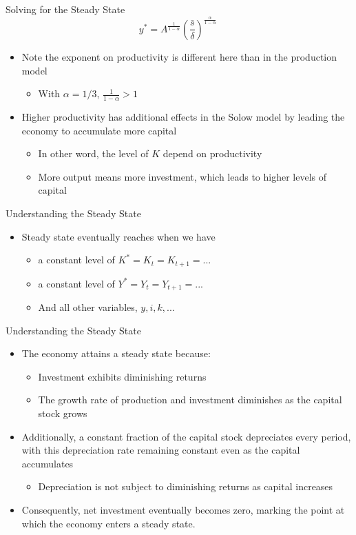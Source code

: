 \documentclass[aspectratio=1610]{beamer}
\begin{document}
\begin{frame}[wide]{Solving for the Steady State}
	\[y^* = A^{\frac{1}{1-\alpha}}\left(\frac{\bar{s} }{\delta}\right)^{\frac{\alpha}{1 - \alpha}}  \ \]
	\begin{itemize}
		\item Note the exponent on productivity is different here than in the production model
		\begin{itemize}
			\item With $\alpha = 1/3$, $\frac{1}{1-\alpha} > 1$
		\end{itemize}
	\vspace{3mm}
		\item Higher productivity has additional effects in the Solow model by leading the economy to accumulate more capital
		\begin{itemize}
			\item In other word, the level of $K$ depend on productivity
			\item More output means more investment, which leads to higher levels of capital
		\end{itemize}
	\end{itemize}
\end{frame}

\begin{frame}[wide]{Understanding the Steady State}
	\begin{itemize}
		\item Steady state eventually reaches when we have 
		\begin{itemize}
			\item a constant level of $K^*=K_t=K_{t+1} =...$
			\item a constant level of $Y^*=Y_t=Y_{t+1} =...$
			\item And all other variables, $y, i, k, ...$
		\end{itemize}
	\end{itemize}
\end{frame}

\begin{frame}[wide]{Understanding the Steady State}
	\begin{itemize}
		\item The economy attains a steady state because:
		\begin{itemize}
			\item Investment exhibits diminishing returns
			\item The growth rate of production and investment diminishes as the capital stock grows
		\end{itemize}
		\item Additionally, a constant fraction of the capital stock depreciates every period, with this depreciation rate remaining constant even as the capital accumulates
		\begin{itemize}
			\item Depreciation is not subject to diminishing returns as capital increases
		\end{itemize}
		\item Consequently, net investment eventually becomes zero, marking the point at which the economy enters a steady state.
	\end{itemize}
\end{frame}
\end{document}
